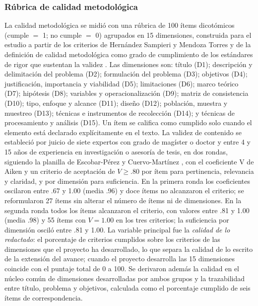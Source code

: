 \documentclass[journal]{IEEEtran}
\begin{document}
\subsubsection{Rúbrica de calidad metodológica}
La calidad metodológica se midió con una rúbrica de 100 ítems dicotómicos (cumple $=$ 1; no cumple $=$ 0) agrupados en 15 dimensiones, construida para el estudio a partir de los criterios de Hernández Sampieri y Mendoza Torres \cite{hernandez2018} y de la definición de calidad metodológica como grado de cumplimiento de los estándares de rigor que sustentan la validez \cite{chacon2023}. Las dimensiones son: título (D1); descripción y delimitación del problema (D2); formulación del problema (D3); objetivos (D4); justificación, importancia y viabilidad (D5); limitaciones (D6); marco teórico (D7); hipótesis (D8); variables y operacionalización (D9); matriz de consistencia (D10); tipo, enfoque y alcance (D11); diseño (D12); población, muestra y muestreo (D13); técnicas e instrumentos de recolección (D14); y técnicas de procesamiento y análisis (D15). Un ítem se califica como cumplido solo cuando el elemento está declarado explícitamente en el texto. La validez de contenido se estableció por juicio de siete expertos con grado de magíster o doctor y entre 4 y 15 años de experiencia en investigación o asesoría de tesis, en dos rondas, siguiendo la planilla de Escobar-Pérez y Cuervo-Martínez \cite{escobar2008}, con el coeficiente V de Aiken \cite{aiken1980} y un criterio de aceptación de $V \geq .80$ por ítem para pertinencia, relevancia y claridad, y por dimensión para suficiencia. En la primera ronda los coeficientes oscilaron entre .67 y 1.00 (media .96) y doce ítems no alcanzaron el criterio; se reformularon 27 ítems sin alterar el número de ítems ni de dimensiones. En la segunda ronda todos los ítems alcanzaron el criterio, con valores entre .81 y 1.00 (media .98) y 55 ítems con $V = 1.00$ en los tres criterios; la suficiencia por dimensión osciló entre .81 y 1.00. La variable principal fue la \emph{calidad de lo redactado}: el porcentaje de criterios cumplidos sobre los criterios de las dimensiones que el proyecto ha desarrollado, lo que separa la calidad de lo escrito de la extensión del avance; cuando el proyecto desarrolla las 15 dimensiones coincide con el puntaje total de 0 a 100. Se derivaron además la calidad en el núcleo común de dimensiones desarrolladas por ambos grupos y la trazabilidad entre título, problema y objetivos, calculada como el porcentaje cumplido de seis ítems de correspondencia.
\end{document}
